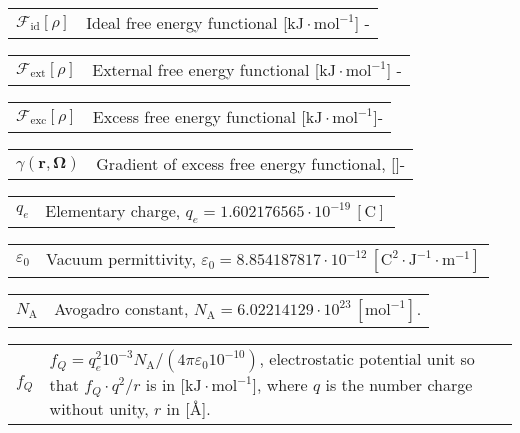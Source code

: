 \hspace{-1.5em}%
\begin{tabular}{>{\raggedright}p{3.3em}l}
$\mathcal{F}_{\mathrm{id}}[\rho]$ & Ideal free energy functional {[}$\mathrm{kJ\cdot mol^{-1}}${]} -\tabularnewline
\end{tabular}

\hspace{-1.5em}%
\begin{tabular}{>{\raggedright}p{3.3em}l}
$\mathcal{F}_{\mathrm{ext}}[\rho]$ & External free energy functional {[}$\mathrm{kJ\cdot mol^{-1}}${]}
-\tabularnewline
\end{tabular}

\hspace{-1.5em}%
\begin{tabular}{>{\raggedright}p{3.3em}l}
$\mathcal{F}_{\mathrm{exc}}[\rho]$ & Excess free energy functional {[}$\mathrm{kJ\cdot mol^{-1}}${]}- \tabularnewline
\end{tabular}

\hspace{-1.5em}%
\begin{tabular}{>{\raggedright}p{3.3em}l}
$\gamma(\mathbf{r},\mathbf{\Omega})$ & Gradient of excess free energy functional, {[}$\mathrm{}${]}-\tabularnewline
\end{tabular}

\hspace{-1.5em}%
\begin{tabular}{>{\raggedright}p{3.3em}l}
$q_{e}$ & Elementary charge, $q_{e}=1.602176565\cdot10^{-19}\,\mathrm{[C]}$\tabularnewline
\end{tabular}

\hspace{-1.5em}%
\begin{tabular}{>{\raggedright}p{3.3em}l}
$\varepsilon_{0}$ & Vacuum permittivity, $\varepsilon_{0}=8.854187817\cdot10^{-12}\,\mathrm{[C^{2}\cdot J^{-1}\cdot m^{-1}]}$\tabularnewline
\end{tabular}

\hspace{-1.5em}%
\begin{tabular}{>{\raggedright}p{3.3em}l}
$N_{\mathrm{A}}$ & Avogadro constant, $N_{\mathrm{A}}=6.02214129\cdot10^{23}\,\mathrm{[mol^{-1}]}$.\tabularnewline
\end{tabular}

\hspace{-1.5em}%
\begin{tabular}{>{\raggedright}p{3.3em}>{\raggedright}p{}}
$f_{Q}$ & $f_{Q}=q_{e}^{2}10^{-3}N_{\mathrm{A}}/(4\pi\varepsilon_{0}10^{-10})$,
electrostatic potential unit so that $f_{Q}\cdot q^{2}/r$ is in {[}$\mathrm{kJ\cdot mol^{-1}}${]},
where $q$ is the number charge without unity, $r$ in {[}$\textrm{\AA}${]}.\tabularnewline
\end{tabular}

